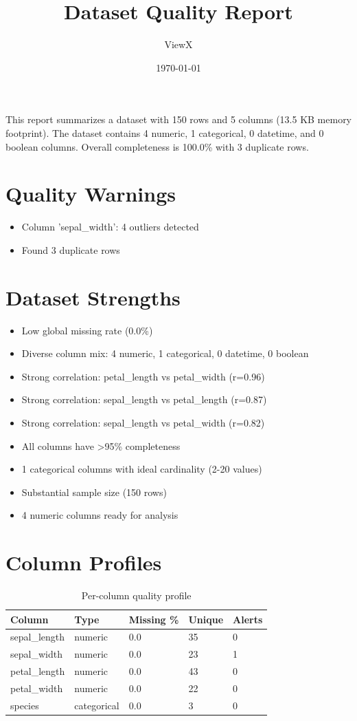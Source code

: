 \documentclass{article}%
\title{Dataset Quality Report}%
\author{ViewX}%
\date{\today}%
\begin{document}
%
\normalsize%
\pgfplotsset{compat=1.18}%
\maketitle%
This report summarizes a dataset with 150 rows and 5 columns (13.5 KB memory footprint). The dataset contains 4 numeric, 1 categorical, 0 datetime, and 0 boolean columns. Overall completeness is 100.0\% with 3 duplicate rows.%
%
\section{Quality Warnings}%
\label{sec:QualityWarnings}%
\begin{itemize}%
\item%
Column 'sepal\_width': 4 outliers detected%
\item%
Found 3 duplicate rows%
\end{itemize}

%
\section{Dataset Strengths}%
\label{sec:DatasetStrengths}%
\begin{itemize}%
\item%
Low global missing rate (0.0\%)%
\item%
Diverse column mix: 4 numeric, 1 categorical, 0 datetime, 0 boolean%
\item%
Strong correlation: petal\_length vs petal\_width (r=0.96)%
\item%
Strong correlation: sepal\_length vs petal\_length (r=0.87)%
\item%
Strong correlation: sepal\_length vs petal\_width (r=0.82)%
\item%
All columns have >95\% completeness%
\item%
1 categorical columns with ideal cardinality (2{-}20 values)%
\item%
Substantial sample size (150 rows)%
\item%
4 numeric columns ready for analysis%
\end{itemize}

%
\section{Column Profiles}%
\label{sec:ColumnProfiles}%
\begin{table}[H]\centering
\caption{Per{-}column quality profile}
\begin{tabular}{l | l | l | l | l}\hline
Column & Type & Missing \% & Unique & Alerts\\ \hline
sepal\_length & numeric & 0.0 & 35 & 0\\ \hline
sepal\_width & numeric & 0.0 & 23 & 1\\ \hline
petal\_length & numeric & 0.0 & 43 & 0\\ \hline
petal\_width & numeric & 0.0 & 22 & 0\\ \hline
species & categorical & 0.0 & 3 & 0\\ \hline
\end{tabular}\end{table}
\end{document}
